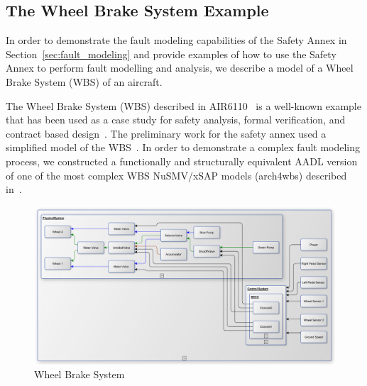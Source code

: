 
 \subsection{The Wheel Brake System Example}
\label{sec:case_study} 

In order to demonstrate the fault modeling capabilities of the Safety Annex in Section~\ref{sec:fault_modeling} and provide examples of how to use the Safety Annex to perform fault modelling and analysis, we describe a model of a Wheel Brake System (WBS) of an aircraft. 

The Wheel Brake System (WBS) described in AIR6110~\cite{AIR6110} is a well-known example that has been used as a case study for safety analysis, formal verification, and contract based design~\cite{DBLP:conf/cav/BozzanoCPJKPRT15, 10.1007/978-3-319-11936-6-7, CAV2015:BoCiGrMa, Joshi05:SafeComp}. The preliminary work for the safety annex used a simplified model of the WBS~\cite{Stewart17:IMBSA}. In order to demonstrate a complex fault modeling process, we constructed a functionally and structurally equivalent AADL version of one of the most complex WBS NuSMV/xSAP models (arch4wbs) described in~\cite{DBLP:conf/cav/BozzanoCPJKPRT15}.    

\begin{figure}[h!]
	\centering
	\includegraphics[trim=0 9 0 5,clip,width=\textwidth]{images/wbs_arch.pdf}
	\caption{Wheel Brake System}
	\label{fig:wbs}
\end{figure} 


